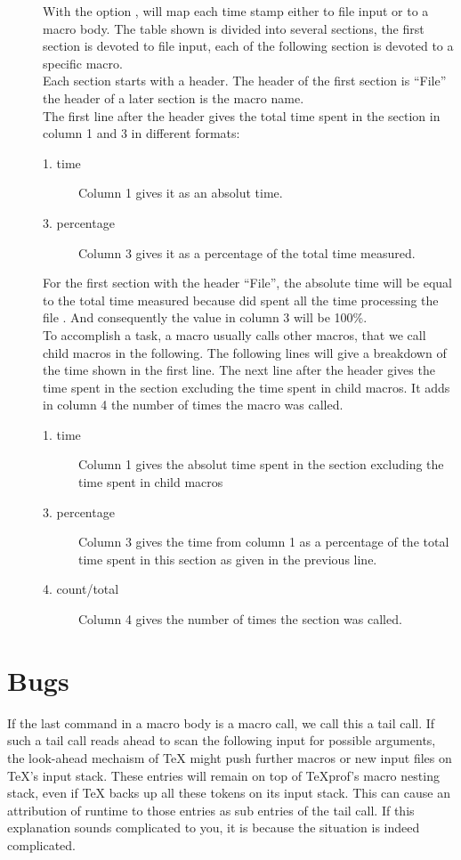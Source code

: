 \documentclass[a4paper,english]{article}
\begin{document}
\begin{description}
\item[  ]
  With the option ,  will map each time stamp
  either to file input or to a macro body.
  The table shown is divided into several sections, the first section
  is devoted to file input, each of the following section is devoted
  to a specific macro.
  \\
  Each section starts with a header. The header of the
  first section is ``File'' the header of a later section is the macro name.
  \\
  The first line after the header gives the total time spent in the section
  in column 1 and 3 in different formats:
  \begin{description}
    \item[1. time]
      Column 1 gives it as an absolut time.
    \item[3. percentage]
      Column 3 gives it as a percentage of the total time measured.
  \end{description}
  For the first section with the header ``File'', the absolute time
  will be equal to the total time measured because 
  did spent all the time processing the file .
  And consequently the value in column 3 will be 100\%.
  \\
  To accomplish a task, a macro usually calls other
  macros, that we call child macros in the following.
  The following lines will give a breakdown of the time shown in the
  first line.
  The next line after the header gives the time spent in the section
  excluding the time spent in child macros. It adds in column 4 the number
  of times the macro was called.
  \begin{description}
    \item[1. time]
      Column 1 gives the absolut time spent in the section excluding the time
      spent in child macros
    \item[3. percentage]
      Column 3 gives the time from column 1 as a percentage of the total time
      spent in this section as given in the previous line.
    \item[4. count/total]
      Column 4 gives the number of times the section was called.
  \end{description}

  

\end{description}


\section{Bugs}
If the last command in a macro body is a macro call, we call this a tail call.
If such a tail call reads ahead to scan the following input
for possible arguments, the look-ahead mechaism of TeX might push further
macros or new input files on TeX's input stack.
These entries will remain on top of TeXprof's macro nesting stack,
even if TeX backs up all these tokens on its input stack.
This can cause an attribution of runtime to those entries as sub entries
of the tail call. If this explanation sounds complicated to you, it is
because the situation is indeed complicated. 
\end{document}

